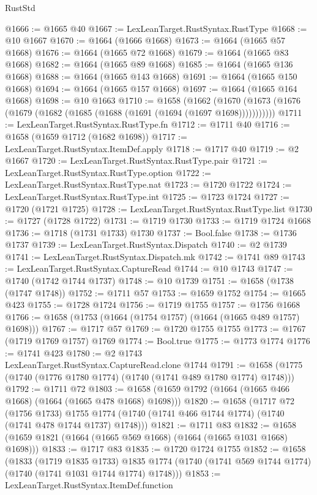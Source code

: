 \begin{lexlean}{RustStd}
\begin{coremodule}
@1666 := @1665 @40
@1667 := LexLeanTarget.RustSyntax.RustType
@1668 := @10 @1667
@1670 := @1664 (@1666 @1668)
@1673 := @1664 (@1665 @57 @1668)
@1676 := @1664 (@1665 @72 @1668)
@1679 := @1664 (@1665 @83 @1668)
@1682 := @1664 (@1665 @89 @1668)
@1685 := @1664 (@1665 @136 @1668)
@1688 := @1664 (@1665 @143 @1668)
@1691 := @1664 (@1665 @150 @1668)
@1694 := @1664 (@1665 @157 @1668)
@1697 := @1664 (@1665 @164 @1668)
@1698 := @10 @1663
@1710 := @1658
    (@1662 (@1670 (@1673 (@1676 (@1679 (@1682 (@1685 (@1688 (@1691 (@1694 (@1697 @1698)))))))))))
@1711 := LexLeanTarget.RustSyntax.RustType.fn
@1712 := @1711 @40
@1716 := @1658 (@1659 @1712 (@1682 @1698))
@1717 := LexLeanTarget.RustSyntax.ItemDef.apply
@1718 := @1717 @40
@1719 := @2 @1667
@1720 := LexLeanTarget.RustSyntax.RustType.pair
@1721 := LexLeanTarget.RustSyntax.RustType.option
@1722 := LexLeanTarget.RustSyntax.RustType.nat
@1723 := @1720 @1722
@1724 := LexLeanTarget.RustSyntax.RustType.int
@1725 := @1723 @1724
@1727 := @1720 (@1721 @1725)
@1728 := LexLeanTarget.RustSyntax.RustType.list
@1730 := @1727 (@1728 @1722)
@1731 := @1719 @1730
@1733 := @1719 @1724 @1668
@1736 := @1718 (@1731 @1733) @1730
@1737 := Bool.false
@1738 := @1736 @1737
@1739 := LexLeanTarget.RustSyntax.Dispatch
@1740 := @2 @1739
@1741 := LexLeanTarget.RustSyntax.Dispatch.mk
@1742 := @1741 @89
@1743 := LexLeanTarget.RustSyntax.CaptureRead
@1744 := @10 @1743
@1747 := @1740 (@1742 @1744 @1737)
@1748 := @10 @1739
@1751 := @1658 (@1738 (@1747 @1748))
@1752 := @1711 @57
@1753 := @1659 @1752
@1754 := @1665 @423
@1755 := @1728 @1724
@1756 := @1719 @1755
@1757 := @1756 @1668
@1766 := @1658 (@1753 (@1664 (@1754 @1757) (@1664 (@1665 @489 @1757) @1698)))
@1767 := @1717 @57
@1769 := @1720 @1755 @1755
@1773 := @1767 (@1719 @1769 @1757) @1769
@1774 := Bool.true
@1775 := @1773 @1774
@1776 := @1741 @423
@1780 := @2 @1743 LexLeanTarget.RustSyntax.CaptureRead.clone @1744
@1791 := @1658 (@1775 (@1740 (@1776 @1780 @1774) (@1740 (@1741 @489 @1780 @1774) @1748)))
@1792 := @1711 @72
@1803 := @1658 (@1659 @1792 (@1664 (@1665 @466 @1668) (@1664 (@1665 @478 @1668) @1698)))
@1820 := @1658
    (@1717
      @72
      (@1756 @1733)
      @1755
      @1774
      (@1740 (@1741 @466 @1744 @1774) (@1740 (@1741 @478 @1744 @1737) @1748)))
@1821 := @1711 @83
@1832 := @1658 (@1659 @1821 (@1664 (@1665 @569 @1668) (@1664 (@1665 @1031 @1668) @1698)))
@1833 := @1717 @83
@1835 := @1720 @1724 @1755
@1852 := @1658
    (@1833
      (@1719 @1835 @1733)
      @1835
      @1774
      (@1740 (@1741 @569 @1744 @1774) (@1740 (@1741 @1031 @1744 @1774) @1748)))
@1853 := LexLeanTarget.RustSyntax.ItemDef.function

\end{coremodule}
\end{lexlean}
